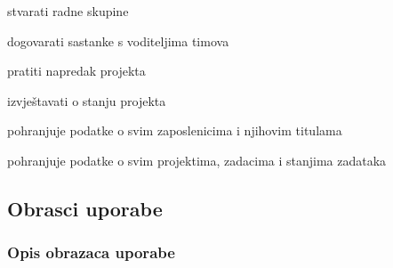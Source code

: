 \begin{packed_enum}
\begin{packed_enum}
				\end{packed_enum}
			
				\item  {}
				
				\begin{packed_enum}
					
					\item stvarati radne skupine
					\item dogovarati sastanke s voditeljima timova
					\item pratiti napredak projekta
					\item izvještavati o stanju projekta
					
				\end{packed_enum}
			
				\item  {}
				
				\begin{packed_enum}
					
					\item pohranjuje podatke o svim zaposlenicima i njihovim titulama
					\item pohranjuje podatke o svim projektima, zadacima i stanjima zadataka
					
				\end{packed_enum}
			
			\end{packed_enum}
			
			\eject 
			
			
				
			\subsection{Obrasci uporabe}
				
				
				\subsubsection{Opis obrazaca uporabe}

					
	
